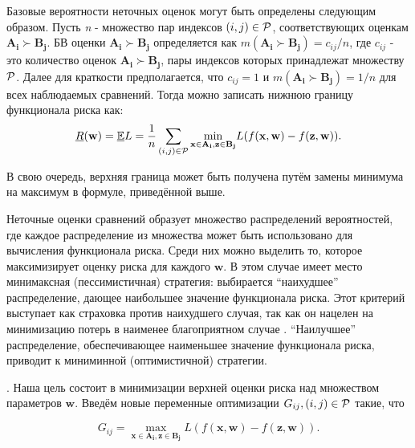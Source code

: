 \documentclass[10pt,a5paper,oneside]{article}
\begin{document}
\par
Базовые вероятности неточных оценок могут быть определены следующим образом. 
Пусть \emph{n} - множество пар индексов \((i, j)  \in \mathcal{P} \), соответствующих оценкам \(\mathbf{A_i} \succ \mathbf{B_j}\). 
БВ оценки \(\mathbf{A_i} \succ \mathbf{B_j}\) определяется как \(m(\mathbf{A_i} \succ \mathbf{B_j}) = c_{ij} / n\), где \(c_{ij}\) - это количество оценок \(\mathbf{A_i} \succ \mathbf{B_j}\), пары индексов которых принадлежат множеству \(\mathcal{P}\). 
Далее для краткости предполагается, что \(c_{ij} = 1\) и \(m(\mathbf{A_i} \succ \mathbf{B_j}) = 1/n\) для всех наблюдаемых сравнений. 
Тогда можно записать нижнюю границу функционала риска как:
\mbox{}
\[
\underline{R}(\mathbf{w}) = \mathbb{\underline{E}}L = \frac{1}{n} \sum \limits_{(i,j) \in \Rho} \underset{%
\mathbf{x} \in \mathbf{A_i}, \mathbf{z} \in \mathbf{B_j}%
}{\operatorname{min}}%
L(f(\mathbf{x}, \mathbf{w}) - f(\mathbf{z}, \mathbf{w})).
\]

\par
В свою очередь, верхняя граница может быть получена путём замены минимума на максимум в формуле, приведённой выше. 

\par
Неточные оценки сравнений образует множество распределений вероятностей, где каждое распределение из множества может быть использовано для вычисления функционала риска.
Среди них можно выделить то, которое максимизирует оценку риска для каждого \(\mathbf{w}\). 
В этом случае имеет место минимаксная (пессимистичная) стратегия: выбирается ``наихудшее'' распределение, дающее наибольшее значение функционала риска. 
Этот критерий выступает как страховка против наихудшего случая, так как он нацелен на минимизацию потерь в наименее благоприятном случае . 
``Наилучшее'' распределение, обеспечивающее наименьшее значение функционала риска, приводит к миниминной (оптимистичной) стратегии.


\vspace*{1em}

\par
{}. 
Наша цель состоит в минимизации верхней оценки риска над множеством параметров \(\mathbf{w}\). 
Введём новые переменные оптимизации \(G_{ij}, (i, j) \in \mathcal{P}\) такие, что

\[
G_{ij} = \underset{\mathbf{x} \in \mathbf{A_i}, \mathbf{z} \in \mathbf{B_j}}{\operatorname{max}} L (f (\mathbf{x}, \mathbf{w}) - f(\mathbf{z}, \mathbf{w})). 
\]
\end{document}
